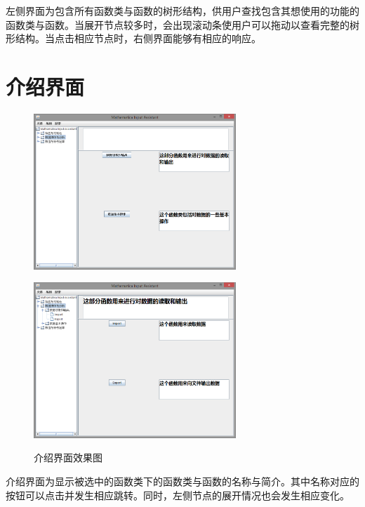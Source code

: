 \documentclass[hyperref, UTF8
,bookmarksnumbered=true, oneside]{ctexbook}
\begin{document}
		左侧界面为包含所有函数类与函数的树形结构，供用户查找包含其想使用的功能的函数类与函数。当展开节点较多时，会出现滚动条使用户可以拖动以查看完整的树形结构。当点击相应节点时，右侧界面能够有相应的响应。
		

	\section{介绍界面} %

		\begin{figure}[!h]
			\begin{minipage}[b]{0.45\textwidth}
			\centering
			\includegraphics[width=3in]{Right01.png}
			\label{pic:MathPack}
			\end{minipage}%
			\hspace{0.1\textwidth}%
			\begin{minipage}[b]{0.45\textwidth}
			\centering
			\includegraphics[width=3in]{Right02.png}
			\label{pic:GUIPack}
			\end{minipage}
			\caption{介绍界面效果图}
		\end{figure}

		介绍界面为显示被选中的函数类下的函数类与函数的名称与简介。其中名称对应的按钮可以点击并发生相应跳转。同时，左侧节点的展开情况也会发生相应变化。
\end{document}
